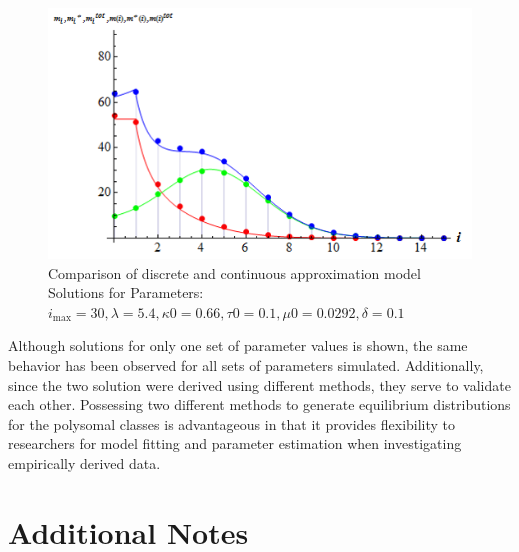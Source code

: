 \documentclass[review]{elsarticle}
\newcommand{\imax}{\ensuremath{i_{\max}}\xspace}
\begin{document}
\begin{figure}[ht]
\centering
\includegraphics[width=\textwidth]{Images/ex_both_eq}
\caption{Comparison of discrete and continuous approximation model Solutions for Parameters: $\imax=30,\lambda=5.4,\kappa 0=0.66,\tau 0=0.1,\mu 0=0.0292,\delta=0.1$}
\end{figure}

Although solutions for only one set of parameter values is shown, the same behavior has been observed for all sets of parameters simulated.
Additionally, since the two solution were derived using different methods, they serve to validate each other.
Possessing two different methods to generate equilibrium distributions for the polysomal classes is advantageous in that it provides flexibility to researchers for model fitting and parameter estimation when investigating empirically derived data.

\section*{Additional Notes}
\end{document}
